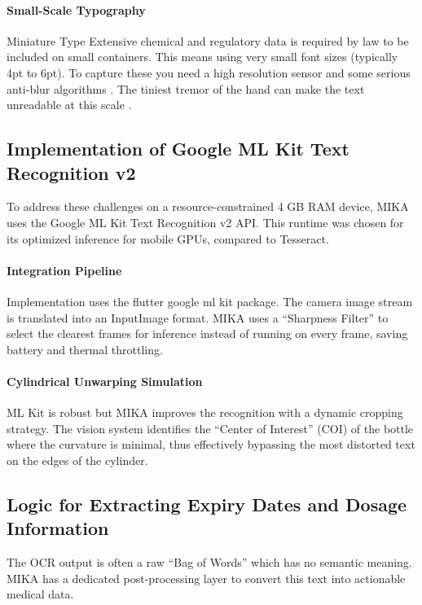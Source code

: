 \documentclass[12pt,a4paper]{report}
\begin{document}
\paragraph{Small-Scale Typography}

Miniature Type Extensive chemical and regulatory data is required by law to be included on small containers. This means using very small font sizes (typically 4pt to 6pt). To capture these you need a high resolution sensor and some serious anti-blur algorithms . The tiniest tremor of the hand can make the text unreadable at this scale .

\subsection{Implementation of Google ML Kit Text Recognition v2}
To address these challenges on a resource-constrained 4 GB RAM device, MIKA uses the Google ML Kit Text Recognition v2 API. This runtime was chosen for its optimized inference for mobile GPUs, compared to Tesseract. 
 
\paragraph{Integration Pipeline}
Implementation uses the flutter google ml kit package. The camera image stream is translated into an InputImage format. MIKA uses a “Sharpness Filter” to select the clearest frames for inference instead of running on every frame, saving battery and thermal throttling. 
 
\paragraph{Cylindrical Unwarping Simulation}
ML Kit is robust but MIKA improves the recognition with a dynamic cropping strategy. The vision system identifies the “Center of Interest” (COI) of the bottle where the curvature is minimal, thus effectively bypassing the most distorted text on the edges of the cylinder.
 
\subsection{Logic for Extracting Expiry Dates and Dosage Information}
 
The OCR output is often a raw “Bag of Words” which has no semantic meaning. MIKA has a dedicated post-processing layer to convert this text into actionable medical data. 
\end{document}
